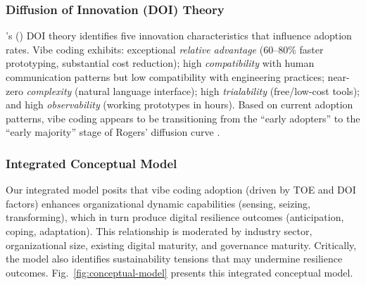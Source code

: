 \documentclass[preprint,12pt,authoryear]{elsarticle}
\begin{document}
\subsubsection{Diffusion of Innovation (DOI) Theory}

\citeauthor{Rogers2003}'s (\citeyear{Rogers2003}) DOI theory identifies five innovation characteristics that influence adoption rates. Vibe coding exhibits: exceptional \emph{relative advantage} (60--80\% faster prototyping, substantial cost reduction); high \emph{compatibility} with human communication patterns but low compatibility with engineering practices; near-zero \emph{complexity} (natural language interface); high \emph{trialability} (free/low-cost tools); and high \emph{observability} (working prototypes in hours). Based on current adoption patterns, vibe coding appears to be transitioning from the ``early adopters'' to the ``early majority'' stage of Rogers' diffusion curve \citep{Rogers2003}.

\subsubsection{Integrated Conceptual Model}

Our integrated model posits that vibe coding adoption (driven by TOE and DOI factors) enhances organizational dynamic capabilities (sensing, seizing, transforming), which in turn produce digital resilience outcomes (anticipation, coping, adaptation). This relationship is moderated by industry sector, organizational size, existing digital maturity, and governance maturity. Critically, the model also identifies sustainability tensions that may undermine resilience outcomes. Fig.~\ref{fig:conceptual-model} presents this integrated conceptual model.
\end{document}
